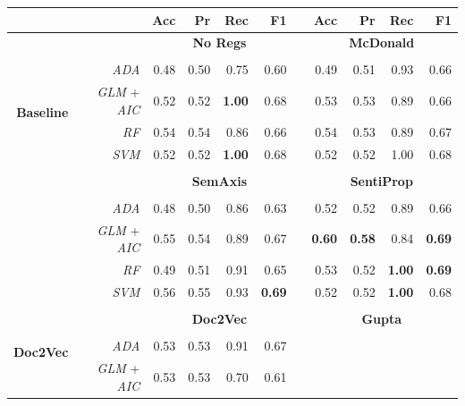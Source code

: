 \documentclass[a4paper, 12pt]{report}
\begin{document}
     \begin{table}[H]
    \setlength{\columnwidth}{1pt}
    \centering
    \begin{threeparttable}
   \begin{tabular}{rrrrrrrrrrr}
      \hline
     & & \textbf{Acc} & \textbf{Pr} & \textbf{Rec} & \textbf{F1} & & \textbf{Acc} & \textbf{Pr} & \textbf{Rec} & \textbf{F1} \\ 
      \midrule
      \multirow{8}{*}{\textbf{Baseline}} & & \multicolumn{4}{c}{\textbf{No Regs}} & & \multicolumn{4}{c}{\textbf{McDonald}} \\
      \cmidrule{3-11}\\
      & \textit{ADA} & 0.48 & 0.50 & 0.75 & 0.60 & & 0.49 & 0.51 & 0.93 & 0.66   \\ 
      & \textit{GLM} + \textit{AIC} &  0.52 & 0.52 & \textbf{1.00} & 0.68 & & 0.53 & 0.53 & 0.89 & 0.66   \\ 
      & \textit{RF} & 0.54 & 0.54 & 0.86 & 0.66 & & 0.54 & 0.53 & 0.89 & 0.67\\ 
      & \textit{SVM} & 0.52 & 0.52 & \textbf{1.00} & 0.68 & & 0.52 & 0.52 & 1.00 & 0.68  \\ 
      \multicolumn{9}{c}{} \\
      \multirow{8}{*}{\textbf{ID}} & & \multicolumn{4}{c}{\textbf{SemAxis}} & & \multicolumn{4}{c}{\textbf{SentiProp}} \\
      \cmidrule{3-11}\\
       & \textit{ADA} & 0.48 & 0.50 & 0.86 & 0.63 & & 0.52 & 0.52 & 0.89 & 0.66 \\ 
      & \textit{GLM} + \textit{AIC} & 0.55 & 0.54 & 0.89 & 0.67 & & \textbf{0.60} & \textbf{0.58} & 0.84 & \textbf{0.69}  \\ 
      & \textit{RF} & 0.49 & 0.51 & 0.91 & 0.65 & & 0.53 & 0.52 & \textbf{1.00} & \textbf{0.69} \\ 
      & \textit{SVM} & 0.56 & 0.55 & 0.93 & \textbf{0.69} & & 0.52 & 0.52 & \textbf{1.00} & 0.68  \\
      \multicolumn{9}{c}{} \\
      \multirow{8}{*}{\textbf{Doc2Vec}} & & \multicolumn{4}{c}{\textbf{Doc2Vec}} & & \multicolumn{4}{c}{\textbf{Gupta}} \\
       \cmidrule{3-11}\\
      & \textit{ADA} & 0.53 & 0.53 & 0.91 & 0.67  & \multicolumn{5}{c}{} \\ 
      & \textit{GLM} + \textit{AIC} & 0.53 & 0.53 & 0.70 & 0.61 & \multicolumn{5}{c}{} \\ 

\end{tabular}
\end{threeparttable}
\end{table}
\end{document}
